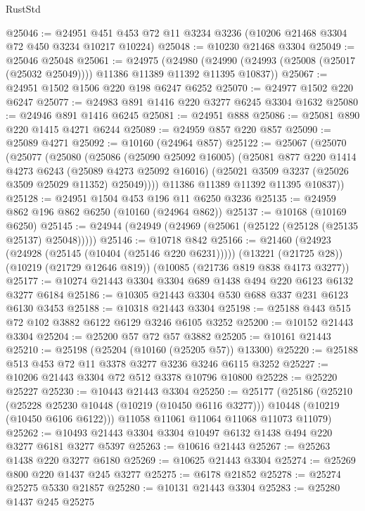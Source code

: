 \begin{lexlean}{RustStd}
\begin{coremodule}
@25046 := @24951 @451 @453 @72 @11 @3234 @3236 (@10206 @21468 @3304 @72 @450 @3234 @10217 @10224)
@25048 := @10230 @21468 @3304
@25049 := @25046 @25048
@25061 := @24975
    (@24980 (@24990 (@24993 (@25008 (@25017 (@25032 @25049)))) @11386 @11389 @11392 @11395 @10837))
@25067 := @24951 @1502 @1506 @220 @198 @6247 @6252
@25070 := @24977 @1502 @220 @6247
@25077 := @24983 @891 @1416 @220 @3277 @6245 @3304 @1632
@25080 := @24946 @891 @1416 @6245
@25081 := @24951 @888
@25086 := @25081 @890 @220 @1415 @4271 @6244
@25089 := @24959 @857 @220 @857
@25090 := @25089 @4271
@25092 := @10160 (@24964 @857)
@25122 := @25067
    (@25070
      (@25077
        (@25080
          (@25086
            (@25090 @25092 @16005)
            (@25081
              @877
              @220
              @1414
              @4273
              @6243
              (@25089 @4273 @25092 @16016)
              (@25021 @3509 @3237 (@25026 @3509 @25029 @11352) @25049))))
        @11386
        @11389
        @11392
        @11395
        @10837))
@25128 := @24951 @1504 @453 @196 @11 @6250 @3236
@25135 := @24959 @862 @196 @862 @6250 (@10160 (@24964 @862))
@25137 := @10168 (@10169 @6250)
@25145 := @24944 (@24949 (@24969 (@25061 (@25122 (@25128 (@25135 @25137) @25048)))))
@25146 := @10718 @842
@25166 := @21460
    (@24923 (@24928 (@25145 (@10404 (@25146 @220 @6231)))))
    (@13221 (@21725 @28))
    (@10219 (@21729 @12646 @819))
    (@10085 (@21736 @819 @838 @4173 @3277))
@25177 := @10274 @21443 @3304 @3304 @689 @1438 @494 @220 @6123 @6132 @3277 @6184
@25186 := @10305 @21443 @3304 @530 @688 @337 @231 @6123 @6130 @3453
@25188 := @10318 @21443 @3304
@25198 := @25188 @443 @515 @72 @102 @3882 @6122 @6129 @3246 @6105 @3252
@25200 := @10152 @21443 @3304
@25204 := @25200 @57 @72 @57 @3882
@25205 := @10161 @21443
@25210 := @25198 (@25204 (@10160 (@25205 @57)) @13300)
@25220 := @25188 @513 @453 @72 @11 @3378 @3277 @3236 @3246 @6115 @3252
@25227 := @10206 @21443 @3304 @72 @512 @3378 @10796 @10800
@25228 := @25220 @25227
@25230 := @10443 @21443 @3304
@25250 := @25177
    (@25186
      (@25210
        (@25228 @25230 @10448 (@10219 (@10450 @6116 @3277)))
        @10448
        (@10219 (@10450 @6106 @6122)))
      @11058
      @11061
      @11064
      @11068
      @11073
      @11079)
@25262 := @10493 @21443 @3304 @3304 @10497 @6132 @1438 @494 @220 @3277 @6181 @3277 @5397
@25263 := @10616 @21443
@25267 := @25263 @1438 @220 @3277 @6180
@25269 := @10625 @21443 @3304
@25274 := @25269 @800 @220 @1437 @245 @3277
@25275 := @6178 @21852
@25278 := @25274 @25275 @5330 @21857
@25280 := @10131 @21443 @3304
@25283 := @25280 @1437 @245 @25275

\end{coremodule}
\end{lexlean}

